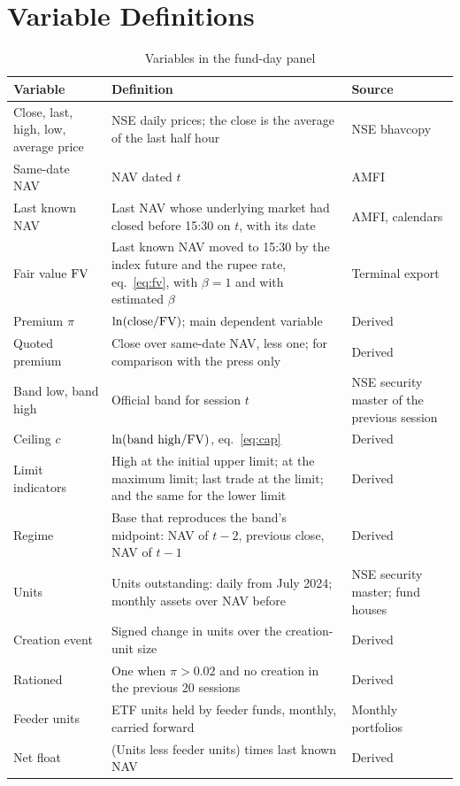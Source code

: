 \section{Variable Definitions}\label{app:variables}
\begin{table}[H]
\centering\small
\caption{Variables in the fund-day panel}\label{tab:variables}
\begin{tabularx}{\textwidth}{L{3.2cm}YL{3.4cm}}
\toprule
Variable & Definition & Source\\
\midrule
Close, last, high, low, average price & NSE daily prices; the close is the average of the last half hour & NSE bhavcopy\\
Same-date NAV & NAV dated $t$ & AMFI\\
Last known NAV & Last NAV whose underlying market had closed before 15:30 on $t$, with its date & AMFI, calendars\\
Fair value $\mathrm{FV}$ & Last known NAV moved to 15:30 by the index future and the rupee rate, eq.~\eqref{eq:fv}, with $\beta=1$ and with estimated $\beta$ & Terminal export\\
Premium $\pi$ & $\ln(\text{close}/\mathrm{FV})$; main dependent variable & Derived\\
Quoted premium & Close over same-date NAV, less one; for comparison with the press only & Derived\\
Band low, band high & Official band for session $t$ & NSE security master of the previous session\\
Ceiling $c$ & $\ln(\text{band high}/\mathrm{FV})$, eq.~\eqref{eq:cap} & Derived\\
Limit indicators & High at the initial upper limit; at the maximum limit; last trade at the limit; and the same for the lower limit & Derived\\
Regime & Base that reproduces the band's midpoint: NAV of $t-2$, previous close, NAV of $t-1$ & Derived\\
Units & Units outstanding: daily from July 2024; monthly assets over NAV before & NSE security master; fund houses\\
Creation event & Signed change in units over the creation-unit size & Derived\\
Rationed & One when $\pi>0.02$ and no creation in the previous 20 sessions & Derived\\
Feeder units & ETF units held by feeder funds, monthly, carried forward & Monthly portfolios\\
Net float & (Units less feeder units) times last known NAV & Derived\\

\end{tabularx}
\end{table}
